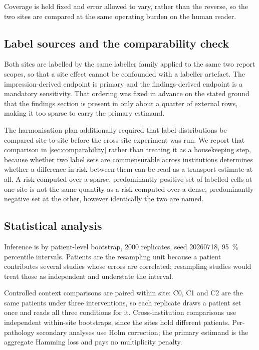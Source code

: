 Coverage is held fixed and error allowed to vary, rather than the reverse, so
the two sites are compared at the same operating burden on the human reader.

\subsection{Label sources and the comparability check}
\label{sec:label-sources}

Both sites are labelled by the same labeller family applied to the same two
report scopes, so that a site effect cannot be confounded with a labeller
artefact. The impression-derived endpoint is primary and the findings-derived
endpoint is a mandatory sensitivity. That ordering was fixed in advance on the
stated ground that the findings section is present in only about a quarter of
external rows, making it too sparse to carry the primary estimand.

The harmonisation plan additionally required that label distributions be
compared site-to-site before the cross-site experiment was run. We report that
comparison in \cref{sec:comparability} rather than treating it as a
housekeeping step, because whether two label sets are commensurable across
institutions determines whether a difference in risk between them can be read as
a transport estimate at all. A risk computed over a sparse, predominantly
positive set of labelled cells at one site is not the same quantity as a risk
computed over a dense, predominantly negative set at the other, however
identically the two are named.

\subsection{Statistical analysis}
\label{sec:power}

Inference is by patient-level bootstrap, \num{2000} replicates, seed
\num{20260718}, \SI{95}{\percent} percentile intervals. Patients are the
resampling unit because a patient contributes several studies whose errors are
correlated; resampling studies would treat those as independent and understate
the interval.

Controlled context comparisons are paired within site: C0, C1 and C2 are the
same patients under three interventions, so each replicate draws a patient set
once and reads all three conditions for it. Cross-institution comparisons use
independent within-site bootstraps, since the sites hold different patients.
Per-pathology secondary analyses use Holm correction; the primary estimand is
the aggregate Hamming loss and pays no multiplicity penalty.

